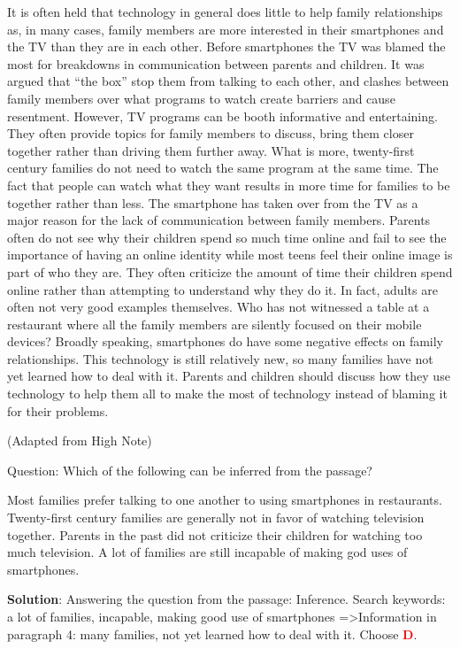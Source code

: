 \documentclass{article}
\begin{document}
{\begin{mdframed}[linewidth=1pt,linecolor=red]
		It is often held that technology in general does little to help family relationships as, in many cases, family members are more interested in their smartphones and the TV than they are in each other. Before smartphones the TV was blamed the most for breakdowns in communication between parents and children. It was argued that “the box” stop them from talking to each other, and clashes between family members over what programs to watch create barriers and cause resentment.
		However, TV programs can be booth informative and entertaining. They often provide topics for family members to discuss, bring them closer together rather than driving them further away. What is more, twenty-first century families do not need to watch the same program at the same time. The fact that people can watch what they want results in more time for families to be together rather than less.
		The smartphone has taken over from the TV as a major reason for the lack of communication between family members. Parents often do not see why their children spend so much time online and fail to see the importance of having an online identity while most teens feel their online image is part of who they are. They often criticize the amount of time their children spend online rather than attempting to understand why they do it. In fact, adults are often not very good examples themselves. Who has not witnessed a table at a restaurant where all the family members are silently focused on their mobile devices?
		Broadly speaking, smartphones do have some negative effects on family relationships. This technology is still relatively new, so many families have not yet learned how to deal with it. Parents and children should discuss how they use technology to help them all to make the most of technology instead of blaming it for their problems.
		
		(Adapted from High Note)
		
		Question: Which of the following can be inferred from the passage?
		\begin{choices}
			\choice Most families prefer talking to one another to using smartphones in restaurants.
			\choice Twenty-first century families are generally not in favor of watching television together.
			\choice Parents in the past did not criticize their children for watching too much television.
			\choice A lot of families are still incapable of making god uses of smartphones.
		\end{choices}
		
		\textbf{Solution}: Answering the question from the passage: Inference. Search keywords: a lot of families, incapable, making good use of smartphones =>Information in paragraph 4: many families, not yet learned how to deal with it. Choose \textcolor{red}{\textbf{D}}. 
		

\end{mdframed}}
\end{document}
